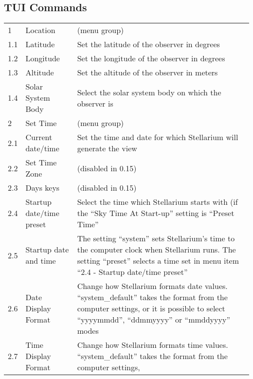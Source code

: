 \subsection{TUI Commands}
\label{sec:plugins:TUI:commands}
\begin{longtable}{l|p{45mm}|p{85mm}}
\toprule
1   & Location & (menu group)\\%
1.1 & Latitude & Set the latitude of the observer in degrees\\%
1.2 & Longitude & Set the longitude of the observer in degrees\\%
1.3 & Altitude & Set the altitude of the observer in meters\\%
1.4 & Solar System Body & Select the solar system body on which the observer is\\\midrule
2   & Set Time & (menu group)\\%
2.1 & Current date/time & Set the time and date for which Stellarium will generate the view\\%
2.2 & Set Time Zone & (disabled in 0.15)\\
2.3 & Days keys & (disabled in 0.15)\\
2.4 & Startup date/time preset & Select the time which Stellarium starts with (if the ``Sky Time At Start-up'' setting is ``Preset Time''\\%
2.5 & Startup date and time & The setting ``system'' sets Stellarium's time to the computer clock when Stellarium runs. 
                                 The setting ``preset'' selects a time set in menu item ``2.4 - Startup date/time preset''\\%
2.6 & Date Display Format & Change how Stellarium formats date values. ``system\_default'' takes the format from the computer settings, 
                            or it is possible to select ``yyyymmdd'', ``ddmmyyyy'' or ``mmddyyyy'' modes\\%
2.7 & Time Display Format & Change how Stellarium formats time values. ``system\_default'' takes the format from the computer settings, 

\end{longtable}
